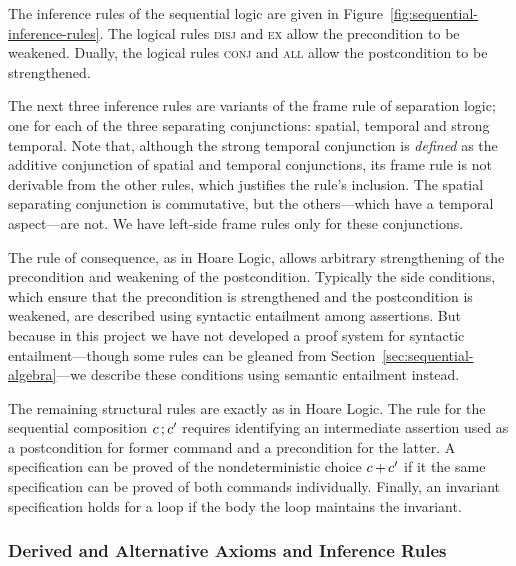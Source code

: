 \documentclass[11pt]{report}
\begin{document}
The inference rules of the sequential logic are given in Figure~\ref{fig:sequential-inference-rules}. The logical rules \textsc{disj} and \textsc{ex} allow the precondition to be weakened. Dually, the logical rules \textsc{conj} and \textsc{all} allow the postcondition to be strengthened. 

The next three inference rules are variants of the frame rule of separation logic; one for each of the three separating conjunctions: spatial, temporal and strong temporal. Note that, although the strong temporal conjunction is \emph{defined} as the additive conjunction of spatial and temporal conjunctions, its frame rule is not derivable from the other rules, which  justifies the rule's inclusion. The spatial separating conjunction is commutative, but the others---which have a temporal aspect---are not. We have left-side frame rules only for these conjunctions. 

The rule of consequence, as in Hoare Logic, allows arbitrary strengthening of the precondition and weakening of the postcondition. Typically the side conditions, which ensure that the precondition is strengthened and 
the postcondition is weakened, are described using syntactic entailment among assertions. But because in this project we have not developed a proof system for syntactic entailment---though some rules can be gleaned from Section~\ref{sec:sequential-algebra}---we describe these conditions using semantic entailment instead. 

The remaining structural rules are exactly as in Hoare Logic. The rule for the sequential composition $c \operatorname{;} c'$ requires identifying an intermediate assertion used as a postcondition for former command and a precondition for the latter. A specification can be proved of the nondeterministic choice $c \operatorname{+} c'$ if it the same specification can be proved of both commands individually. Finally, an invariant specification holds for a loop if the body the loop maintains the invariant. 

\subsubsection{Derived and Alternative Axioms and Inference Rules}
\end{document}
